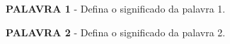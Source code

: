 \begin{glossario}

\textbf{PALAVRA 1} - Defina o significado da palavra 1.

\textbf{PALAVRA 2} - Defina o significado da palavra 2.

\end{glossario}